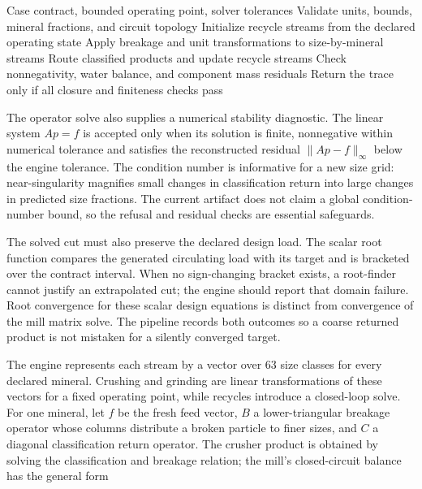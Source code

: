 \documentclass[10pt]{article}
\begin{document}
\begin{algorithm}
\caption{Solve and audit a closed circuit}
\label{alg:closed-circuit}
\begin{algorithmic}[1]
\Require Case contract, bounded operating point, solver tolerances
\State Validate units, bounds, mineral fractions, and circuit topology
\State Initialize recycle streams from the declared operating state
\Repeat
\State Apply breakage and unit transformations to size-by-mineral streams
\State Route classified products and update recycle streams
\State Check nonnegativity, water balance, and component mass residuals
\State Return the trace only if all closure and finiteness checks pass
\end{algorithmic}
\end{algorithm}

The operator solve also supplies a numerical stability diagnostic. The
linear system \(A p=f\) is accepted only when its solution is finite,
nonnegative within numerical tolerance and satisfies the reconstructed
residual \(\|Ap-f\|_\infty\) below the engine tolerance. The condition
number is informative for a new size grid: near-singularity magnifies
small changes in classification return into large changes in predicted
size fractions. The current artifact does not claim a global
condition-number bound, so the refusal and residual checks are essential
safeguards.

The solved cut must also preserve the declared design load. The scalar
root function compares the generated circulating load with its target
and is bracketed over the contract interval. When no sign-changing
bracket exists, a root-finder cannot justify an extrapolated cut; the
engine should report that domain failure. Root convergence for these
scalar design equations is distinct from convergence of the mill matrix
solve. The pipeline records both outcomes so a coarse returned product
is not mistaken for a silently converged target.

The engine represents each stream by a vector over 63 size classes for
every declared mineral. Crushing and grinding are linear transformations
of these vectors for a fixed operating point, while recycles introduce a
closed-loop solve. For one mineral, let \(f\) be the fresh feed vector,
\(B\) a lower-triangular breakage operator whose columns distribute a
broken particle to finer sizes, and \(C\) a diagonal classification
return operator. The crusher product is obtained by solving the
classification and breakage relation; the mill's closed-circuit balance
has the general form
\end{document}
